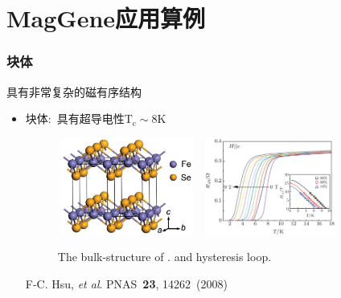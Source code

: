 \documentclass[cjk,slidestop,compress,mathserif,blue]{beamer}
\begin{document}
\section{\rm{MagGene}应用算例}
\frame
{
	\frametitle{块体}
具有非常复杂的磁有序结构
	\begin{itemize}
		\item 块体:~具有超导电性$\mathrm{T_c}\sim8\mathrm{K}$
\begin{figure}[h!]
\centering
\includegraphics[height=1.25in,width=1.80in]{Figures/FeSe-struct-2.png}
\hskip 0.5pt
\includegraphics[height=1.25in,width=1.80in]{Figures/FeSe-Mag-Tc.png}
\caption{\tiny \textrm{The bulk-structure of . and hysteresis loop. }}%
\label{Fig:Mag-bulk-FeSe}
\end{figure}
\textrm{F-C. Hsu, \textit{et al}. PNAS \textbf{23}, 14262~(2008)}
	\end{itemize}
}
\end{document}
